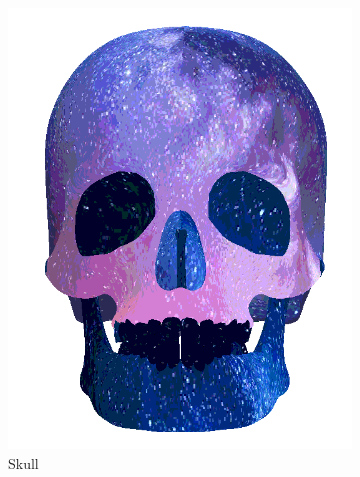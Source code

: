\begin{figure}[h]
\begin{subfigure}[b]{0.2\textwidth}
        \includegraphics[width=\textwidth]{img/textures/TextureReplacementSkull.png}
        \caption{Skull}
        \label{fig:TextureReplacementSkull}
    \end{subfigure}
     ~
    \centering
    \begin{subfigure}[b]{0.2\textwidth}

\end{subfigure}
\end{figure}
